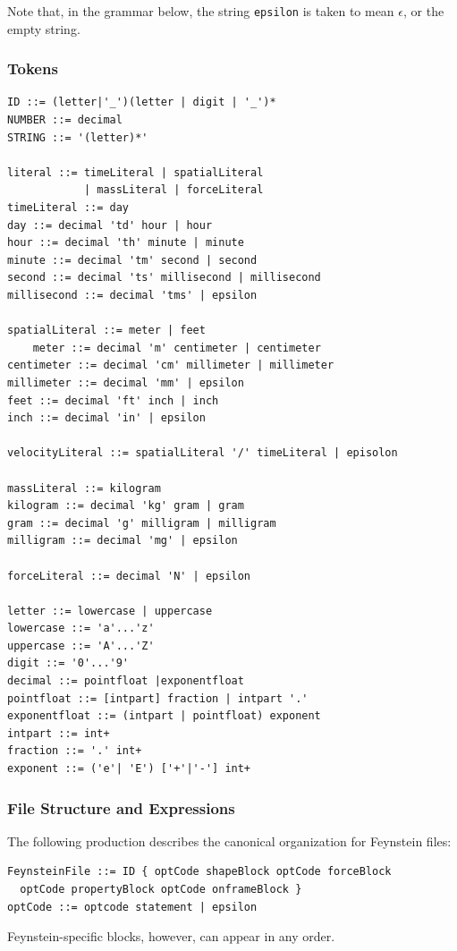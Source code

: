 Note that, in the grammar below, the string \texttt{epsilon} is taken
to mean $\epsilon$, or the empty string.

\subsubsection{Tokens}

\begin{verbatim}
ID ::= (letter|'_')(letter | digit | '_')*
NUMBER ::= decimal
STRING ::= '(letter)*'

literal ::= timeLiteral | spatialLiteral 
            | massLiteral | forceLiteral
timeLiteral ::= day
day ::= decimal 'td' hour | hour
hour ::= decimal 'th' minute | minute
minute ::= decimal 'tm' second | second
second ::= decimal 'ts' millisecond | millisecond 
millisecond ::= decimal 'tms' | epsilon

spatialLiteral ::= meter | feet
	meter ::= decimal 'm' centimeter | centimeter
centimeter ::= decimal 'cm' millimeter | millimeter
millimeter ::= decimal 'mm' | epsilon
feet ::= decimal 'ft' inch | inch
inch ::= decimal 'in' | epsilon

velocityLiteral ::= spatialLiteral '/' timeLiteral | episolon

massLiteral ::= kilogram
kilogram ::= decimal 'kg' gram | gram
gram ::= decimal 'g' milligram | milligram
milligram ::= decimal 'mg' | epsilon

forceLiteral ::= decimal 'N' | epsilon

letter ::= lowercase | uppercase
lowercase ::= 'a'...'z'
uppercase ::= 'A'...'Z'
digit ::= '0'...'9'
decimal ::= pointfloat |exponentfloat
pointfloat ::= [intpart] fraction | intpart '.'
exponentfloat ::= (intpart | pointfloat) exponent
intpart ::= int+
fraction ::= '.' int+
exponent ::= ('e'| 'E') ['+'|'‐'] int+
\end{verbatim}

\subsubsection{File Structure and Expressions}

The following production describes the canonical organization for Feynstein files:
\begin{verbatim}
FeynsteinFile ::= ID { optCode shapeBlock optCode forceBlock 
  optCode propertyBlock optCode onframeBlock }
optCode ::= optcode statement | epsilon
\end{verbatim}
Feynstein-specific blocks, however, can appear in any order.

